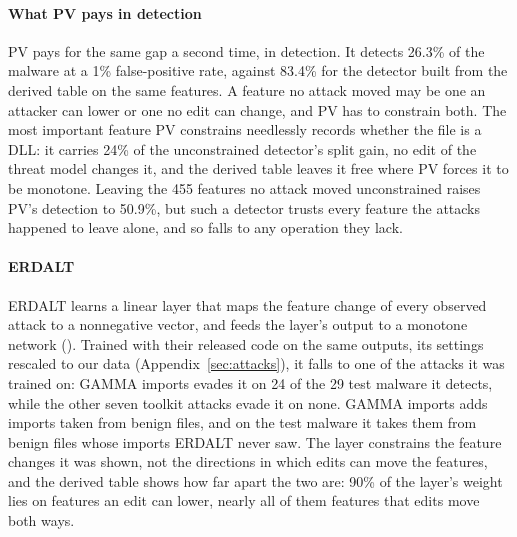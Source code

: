 \paragraph{What PV pays in detection}
PV pays for the same gap a second time, in detection. It detects 26.3\% of the malware at a 1\% false-positive rate,
against 83.4\% for the detector built from the derived table on the same features. A feature no attack moved may be
one an attacker can lower or one no edit can change, and PV has to constrain both. The most important feature PV
constrains needlessly records whether the file is a DLL: it carries 24\% of the unconstrained detector's split gain, no
edit of the threat model changes it, and the derived table leaves it free where PV forces it to be monotone. Leaving
the 455 features no attack moved unconstrained raises PV's detection to 50.9\%, but such a detector trusts every
feature the attacks happened to leave alone, and so falls to any operation they lack.

\paragraph{ERDALT}
ERDALT learns a linear layer that maps the feature change of every observed attack to a nonnegative vector, and feeds
the layer's output to a monotone network (). Trained with their released code on the same
outputs, its settings rescaled to our data (Appendix~\ref{sec:attacks}), it falls to one of the attacks it was
trained on: GAMMA imports evades it on 24 of the 29 test malware it detects, while
the other seven toolkit attacks evade it on none. GAMMA imports adds imports taken from benign files, and on the test
malware it takes them from benign files whose imports ERDALT never saw. The layer constrains the feature changes it
was shown, not the directions in which edits can move the features, and the derived table shows how far apart the two
are: 90\% of the layer's weight lies on features an edit can lower, nearly all of them features that edits move both
ways.

